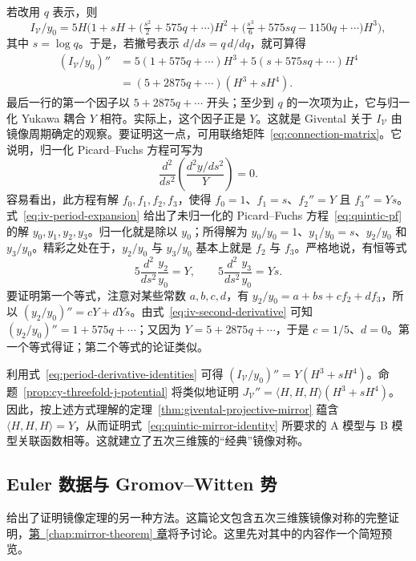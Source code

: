 若改用 $q$ 表示，则
\[
I_{\mathcal V}/y_0=5H\Big(1+sH+\bigl(\tfrac{s^2}{2}+575q+\cdots\bigr)H^2
+\bigl(\tfrac{s^3}{6}+575sq-1150q+\cdots\bigr)H^3\Big),
\]
其中 $s=\log q$。于是，若撇号表示 $d/ds=q\,d/dq$，就可算得
\begin{equation}\label{eq:iv-second-derivative}
\begin{aligned}
(I_{\mathcal V}/y_0)''
&=5(1+575q+\cdots)H^3+5(s+575sq+\cdots)H^4\\
&=(5+2875q+\cdots)(H^3+sH^4).
\end{aligned}
\end{equation}
最后一行的第一个因子以 $5+2875q+\cdots$ 开头；至少到 $q$ 的一次项为止，它与归一化 Yukawa 耦合 $Y$ 相符。实际上，这个因子正是 $Y$。这就是 Givental 关于 $I_{\mathcal V}$ 由镜像周期确定的观察。要证明这一点，可用联络矩阵~\eqref{eq:connection-matrix}。它说明，归一化 Picard--Fuchs 方程可写为
\[
\frac{d^2}{ds^2}\left(\frac{d^2y/ds^2}{Y}\right)=0.
\]
容易看出，此方程有解 $f_0,f_1,f_2,f_3$，使得 $f_0=1$、$f_1=s$、$f_2''=Y$ 且 $f_3''=Ys$。式~\eqref{eq:iv-period-expansion} 给出了未归一化的 Picard--Fuchs 方程~\eqref{eq:quintic-pf} 的解 $y_0,y_1,y_2,y_3$。归一化就是除以 $y_0$；所得解为 $y_0/y_0=1$、$y_1/y_0=s$、$y_2/y_0$ 和 $y_3/y_0$。精彩之处在于，$y_2/y_0$ 与 $y_3/y_0$ 基本上就是 $f_2$ 与 $f_3$。严格地说，有恒等式
\begin{equation}\label{eq:period-derivative-identities}
5\frac{d^2}{ds^2}\frac{y_2}{y_0}=Y,
\qquad
5\frac{d^2}{ds^2}\frac{y_3}{y_0}=Ys.
\end{equation}
要证明第一个等式，注意对某些常数 $a,b,c,d$，有 $y_2/y_0=a+bs+cf_2+df_3$，所以 $(y_2/y_0)''=cY+dYs$。由式~\eqref{eq:iv-second-derivative} 可知 $(y_2/y_0)''=1+575q+\cdots$；又因为 $Y=5+2875q+\cdots$，于是 $c=1/5$、$d=0$。第一个等式得证；第二个等式的论证类似。

利用式~\eqref{eq:period-derivative-identities} 可得 $(I_{\mathcal V}/y_0)''=Y(H^3+sH^4)$。命题~\ref{prop:cy-threefold-j-potential} 将类似地证明 $J_{\mathcal V}''=\langle H,H,H\rangle(H^3+sH^4)$。因此，按上述方式理解的定理~\ref{thm:givental-projective-mirror} 蕴含 $\langle H,H,H\rangle=Y$，从而证明式~\eqref{eq:quintic-mirror-identity} 所要求的 A 模型与 B 模型关联函数相等。这就建立了五次三维簇的“经典”镜像对称。

\subsection{Euler 数据与 Gromov--Witten 势}\label{subsec:euler-data}

 给出了证明镜像定理的另一种方法。这篇论文包含五次三维簇镜像对称的完整证明，\hyperref[chap:mirror-theorem]{第~\ref*{chap:mirror-theorem} 章}将予讨论。这里先对其中的内容作一个简短预览。

